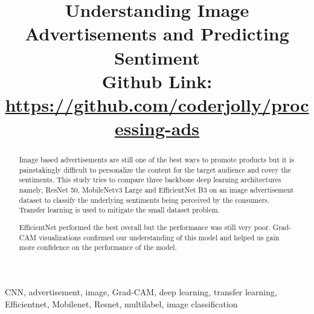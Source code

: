 \documentclass[conference]{IEEEtran}
\begin{document}
\title{Understanding Image Advertisements and Predicting Sentiment\\
{\footnotesize \textbf{Github Link:} \url{https://github.com/coderjolly/processing-ads}}
}

\author{
\and
{}
}


\maketitle

\begin{abstract}
Image based advertisements are still one of the best ways to promote products 
but it is painstakingly difficult to personalize the content for the target audience 
and covey the sentiments. This study tries to compare three backbone deep learning 
architectures namely, ResNet 50, MobileNetv3 Large and EfficientNet B3 
on an image advertisement dataset to classify the underlying sentiments 
being perceived by the consumers. Transfer learning is used to mitigate the small 
dataset problem.

EfficientNet performed the best overall but the performance was still very poor. Grad-CAM visualizations
confirmed our understanding of this model and helped us gain more confidence on the performance of the model.
\end{abstract}

\begin{IEEEkeywords}
CNN, advertisement, image, Grad-CAM, deep learning, transfer learning, Efficientnet, Mobilenet, Resnet, multilabel, image classification
\end{IEEEkeywords}
\end{document}
